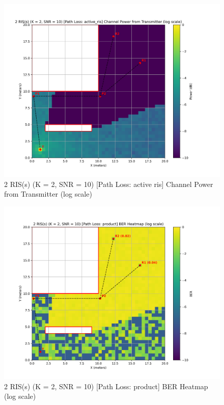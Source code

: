 \begin{figure}[H]
  \centering
  \includegraphics[width=0.8\linewidth]{imgs/heatmap-simulations/2 RIS(s) (K = 2, SNR = 10) [Path Loss_ active_ris] Channel Power from Transmitter (log scale).png}
  \caption{2 RIS(s) (K = 2, SNR = 10) [Path Loss: active ris] Channel Power from Transmitter (log scale)}
\end{figure}

\begin{figure}[H]
  \centering
  \includegraphics[width=0.8\linewidth]{imgs/heatmap-simulations/2 RIS(s) (K = 2, SNR = 10) [Path Loss_ product] BER Heatmap (log scale).png}
  \caption{2 RIS(s) (K = 2, SNR = 10) [Path Loss: product] BER Heatmap (log scale)}
\end{figure}

